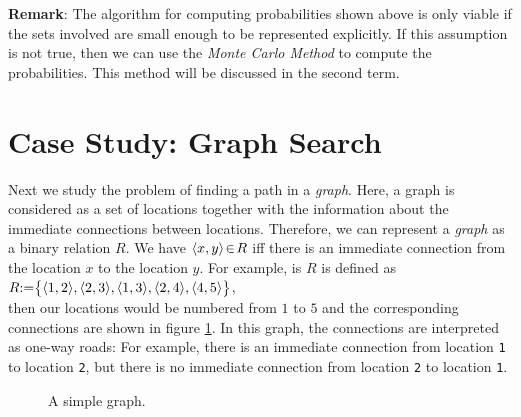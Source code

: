 \noindent
\textbf{Remark}:  The algorithm for computing  probabilities shown above is only viable
if the sets involved are small enough to be represented explicitly. 
If this assumption is not true, then we can use the 
 \emph{Monte Carlo Method} to compute the probabilities.  This method will be discussed in
 the second term.
\pagebreak


\section{Case Study: Graph Search}
Next we study the problem of finding a path in a \emph{graph}. 
Here, a graph is considered as a set of locations together with the information about the
immediate connections between locations.  Therefore, 
 we can represent a \emph{graph} as a binary relation $R$.  We have $\pair(x, y) \el R$ iff there is an immediate
connection from the location $x$ to the location $y$.  For example, is $R$ is defined as
\\[0.2cm]
\hspace*{0.5cm} 
$R \mathtt{:=} \bigl\{ \pair(1,2), \pair(2,3), \pair(1,3), \pair(2,4), \pair(4,5) \bigr\}$,
\\[0.2cm]
then our locations would be numbered from $1$ to $5$ and the corresponding connections are
shown in figure \ref{fig:graph0}.
In this graph, the connections are interpreted as one-way roads:  For example, there
is an immediate connection from location \texttt{1} to location
\texttt{2}, but there is no immediate connection from location \texttt{2} to
location \texttt{1}.

\begin{figure}[!ht]
  \centering
  \caption{A simple graph.}
  \label{fig:graph0}
\end{figure}

